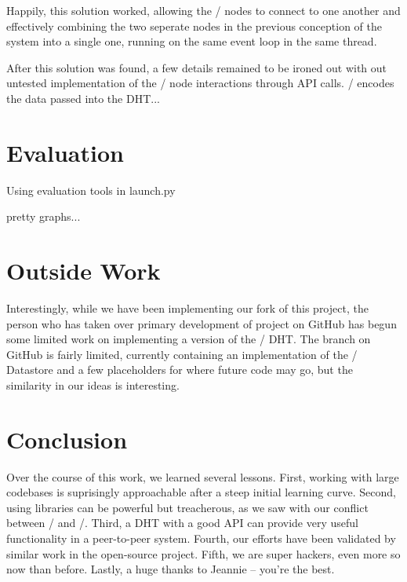\documentclass[11pt,twocolumn]{article}
\begin{document}
Happily, this solution worked, allowing the \Entangled/ nodes to connect to one another and effectively combining the two seperate nodes in the previous conception of the system into a single one, running on the same event loop in the same thread.

After this solution was found, a few details remained to be ironed out with out untested implementation of the \Entangled/ node interactions through API calls. \Entangled/ encodes the data passed into the DHT...






\section{Evaluation}
Using evaluation tools in launch.py

pretty graphs...






\section{Outside Work}
Interestingly, while we have been implementing our fork of this project, the person who has taken over primary development of project on GitHub has begun some limited work on implementing a version of the \Kademlia/ DHT.
The branch on GitHub is fairly limited, currently containing an implementation of the \Kademlia/ Datastore and a few placeholders for where future code may go, but the similarity in our ideas is interesting.






\section{Conclusion}
Over the course of this work, we learned several lessons.
First, working with large codebases is suprisingly approachable after a steep initial learning curve.
Second, using libraries can be powerful but treacherous, as we saw with our conflict between \Entangled/ and \Tornado/.
Third, a DHT with a good API can provide very useful functionality in a peer-to-peer system.
Fourth, our efforts have been validated by similar work in the open-source project.
Fifth, we are super hackers, even more so now than before.
Lastly, a huge thanks to Jeannie -- you're the best.
\end{document}
